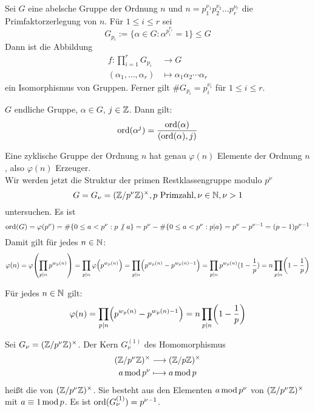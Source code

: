 \begin{falko} \label{F4.2}
	Sei $G$ eine abelsche Gruppe der Ordnung $n$ und $n = p_1^{\nu_1} p_2^{\nu_2} \dots p_r^{\nu_r}$ die Primfaktorzerlegung von $n$. Für $1 \leq i \leq r$ sei
	\[ G_{p_i} := \{\alpha \in G : \alpha^{p_i^{\nu_i}} = 1 \} \leq G \]
	Dann ist die Abbildung
	\begin{equation}
	\begin{aligned}
		f\colon \prod_{i=1}^{r} G_{p_i} &\longrightarrow G \\
		(\alpha_1,\dots,\alpha_r) &\longmapsto \alpha_1 \alpha_2 \cdots \alpha_r \label{eq_F4.2}
	\end{aligned}
	\end{equation}
	ein Isomorphismus von Gruppen. Ferner gilt $\# G_{p_i} = p_i^{\nu_i}$ für $1 \leq i \leq r$.
\end{falko}

	$G$ endliche Gruppe, $\alpha \in G$, $j \in \mathbb{Z}$. Dann gilt:
	\[ \operatorname{ord}(\alpha^j) = \frac{\operatorname{ord}(\alpha)}{(\operatorname{ord}(\alpha),j)} \]
	
	Eine zyklische Gruppe der Ordnung $n$ hat genau $\varphi(n)$ Elemente der Ordnung $n$, also $\varphi(n)$ Erzeuger. \\
	
	
Wir werden jetzt die Struktur der primen Restklassengruppe modulo $p^\nu$ 
\[ G = G_\nu = (\mathbb{Z}/p^\nu\mathbb{Z})^\times, p \text{ Primzahl}, \nu \in \mathbb{N}, \nu > 1 \]
untersuchen. Es ist
\[ \operatorname{ord}(G) = \varphi(p^\nu) = \# \{0 \leq a < p^\nu : p \not | \ a \} = p^\nu - \# \{0 \leq a < p^\nu : p | a \} = p^\nu - p^{\nu-1} = (p-1) p^{\nu-1} \]
Damit gilt für jedes $n \in \mathbb{N}$:
\[ \varphi(n) = \varphi \enbrace*{ \prod_{p|n} p^{w_p(n)}} = \prod_{p | n} \varphi \enbrace*{p^{w_p(n)}} = \prod_{p | n} \enbrace*{p^{w_p(n)}-p^{w_p(n)-1}} = \prod_{p | n} p^{w_p(n)} \enbrace{1- \frac{1}{p}} = n \prod_{p | n} \enbrace*{1- \frac{1}{p}}\]

\begin{falko} \label{F4.3}
	Für jedes $n \in \mathbb{N}$ gilt:
	\[ \varphi(n) = \prod_{p|n} \enbrace*{p^{w_p(n)} - p^{w_p(n)-1}} = n \prod_{p | n} \enbrace*{1 - \frac{1}{p}} \]
\end{falko}

\begin{defn}
	Sei $G_\nu = (\mathbb{Z}/p^\nu\mathbb{Z})^\times$. Der Kern $G_\nu^{(1)}$ des Homomorphismus 
	\begin{equation}
	\begin{aligned}
		(\mathbb{Z}/p^\nu\mathbb{Z})^\times &\longrightarrow (\mathbb{Z}/p\mathbb{Z})^\times \\
		a \operatorname{mod} p^\nu &\longmapsto a \operatorname{mod} p
	\end{aligned}
	\end{equation}
	heißt die  von $(\mathbb{Z}/p^\nu \mathbb{Z})^\times$. Sie besteht aus den Elementen $a \operatorname{mod} p^\nu$ von $(\mathbb{Z}/p^\nu\mathbb{Z})^\times$ mit $a \equiv 1 \operatorname{mod} p$. Es ist $\operatorname{ord}(G_\nu^{(1)}) = p^{\nu-1}$.
\end{defn}

